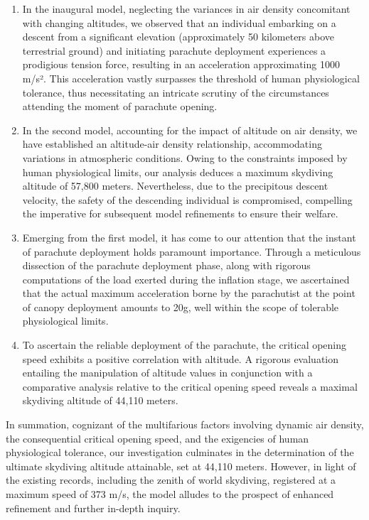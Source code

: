 \documentclass[12pt]{article}
\begin{document}
\begin{enumerate}
    \item In the inaugural model, neglecting the variances in air density concomitant with changing altitudes, 
    we observed that an individual embarking on a descent from a significant elevation (approximately 50 kilometers 
    above terrestrial ground) and initiating parachute deployment experiences a prodigious tension force, resulting 
    in an acceleration approximating 1000 m/s². This acceleration vastly surpasses the threshold of human physiological 
    tolerance, thus necessitating an intricate scrutiny of the circumstances attending the moment of parachute opening.

    \item In the second model, accounting for the impact of altitude on air density, we have established an altitude-air 
    density relationship, accommodating variations in atmospheric conditions. Owing to the constraints imposed by human 
    physiological limits, our analysis deduces a maximum skydiving altitude of 57,800 meters. Nevertheless, due to the precipitous descent 
    velocity, the safety of the descending individual is compromised, compelling the imperative for subsequent model refinements to ensure 
    their welfare.

    \item Emerging from the first model, it has come to our attention that the instant of parachute deployment holds paramount importance. 
    Through a meticulous dissection of the parachute deployment phase, along with rigorous computations of the load exerted during the 
    inflation stage, we ascertained that the actual maximum acceleration borne by the parachutist at the point of canopy deployment amounts 
    to 20g, well within the scope of tolerable physiological limits.

    \item To ascertain the reliable deployment of the parachute, the critical opening speed exhibits a positive correlation with altitude. 
    A rigorous evaluation entailing the manipulation of altitude values in conjunction with a comparative analysis relative to the critical 
    opening speed reveals a maximal skydiving altitude of 44,110 meters.
\end{enumerate}

In summation, cognizant of the multifarious factors involving dynamic air density, the consequential critical opening speed, 
and the exigencies of human physiological tolerance, our investigation culminates in the determination of the ultimate skydiving 
altitude attainable, set at 44,110 meters. However, in light of the existing records, including the zenith of world skydiving, 
registered at a maximum speed of 373 m/s, the model alludes to the prospect of enhanced refinement and further in-depth inquiry.
\end{document}
